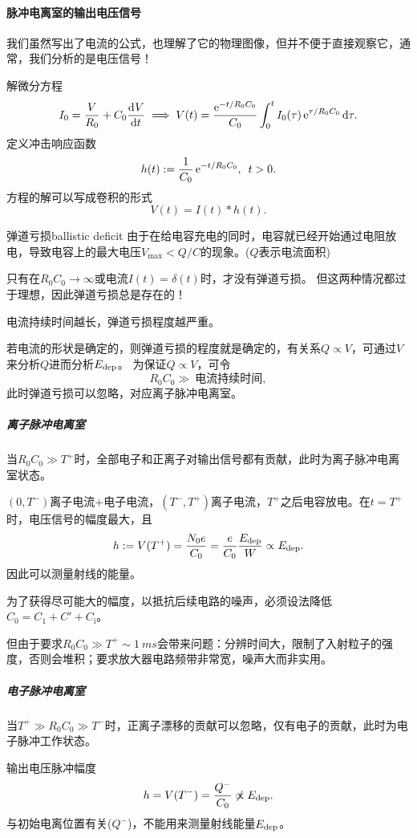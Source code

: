 \paragraph{脉冲电离室的输出电压信号}
我们虽然写出了电流的公式，也理解了它的物理图像，但并不便于直接观察它，通常，我们分析的是电压信号！

解微分方程
\begin{equation}\label{eq:nrd-rc-pulse-solution}
	I_0 = \frac V{R_0} + C_0\frac{\mathop{}\!\mathrm{d}^{}V}{\mathrm{d}{t}^{}} \implies V(t) = \frac{\mathop{}\!\mathrm{e}^{-t/R_0C_0}}{C_0}\int_0^tI_0(\tau)\mathop{}\!\mathrm{e}^{\tau/R_0C_0}\mathop{}\!\mathrm{d}\tau.
\end{equation}
定义冲击响应函数
\begin{equation}\label{eq:nrd-rc-impulse-response}
	h(t) := \frac1{C_0}\mathop{}\!\mathrm{e}^{-t/R_0C_0},\enspace t > 0.
\end{equation}
方程的解可以写成卷积的形式
\begin{equation}\label{eq:nrd-rc-convolution}
	V(t) = I(t) \ast h(t).
\end{equation}
\begin{definition}{弹道亏损}{ballistic deficit}
	由于在给电容充电的同时，电容就已经开始通过电阻放电，导致电容上的最大电压$V_{\max} < Q/C$的现象。($Q$表示电流面积)
\end{definition}
只有在$R_0C_0 \to \infty$或电流$I(t) = \delta(t)$时，才没有弹道亏损。
但这两种情况都过于理想，因此弹道亏损总是存在的！

电流持续时间越长，弹道亏损程度越严重。%

若电流的形状是确定的，则弹道亏损的程度就是确定的，有关系$Q \propto V$，可通过$V$来分析$Q$进而分析$E_{\mathrm{dep}}$。
为保证$Q \propto V$，可令
\[
	R_0C_0 \gg ~\text{电流持续时间},
\]
此时弹道亏损可以忽略，对应离子脉冲电离室。
\subparagraph{离子脉冲电离室}
当$R_0C_0 \gg T^+$时，全部电子和正离子对输出信号都有贡献，此时为离子脉冲电离室状态。
\begin{notecaptionblock}
\end{notecaptionblock}
$(0,T^-)$离子电流+电子电流，$(T^-,T^+)$离子电流，$T^+$之后电容放电。在$t = T^+$时，电压信号的幅度最大，且
\begin{align}
	h := V(T^+) = \frac{N_0e}{C_0} = \frac{e}{C_0}\frac{E_{\mathrm{dep}}}W \propto E_{\mathrm{dep}}.
\end{align}
因此可以测量射线的能量。

为了获得尽可能大的幅度，以抵抗后续电路的噪声，必须设法降低$C_0 = C_1 + C' + C_{\mathrm{i}}$。

但由于要求$R_0C_0 \gg T^+ \sim \qty{1}{ms}$会带来问题：分辨时间大，限制了入射粒子的强度，否则会堆积；要求放大器电路频带非常宽，噪声大而非实用。
\subparagraph{电子脉冲电离室}
当$T^+ \gg R_0C_0 \gg T^-$时，正离子漂移的贡献可以忽略，仅有电子的贡献，此时为电子脉冲工作状态。
\begin{notecaptionblock}
\end{notecaptionblock}
输出电压脉冲幅度
\[
	h = V(T^-) = \frac{Q^-}{C_0}\not \propto E_{\mathrm{dep}}.
\]
与初始电离位置有关($Q^-$)，不能用来测量射线能量$E_{\mathrm{dep}}$。

